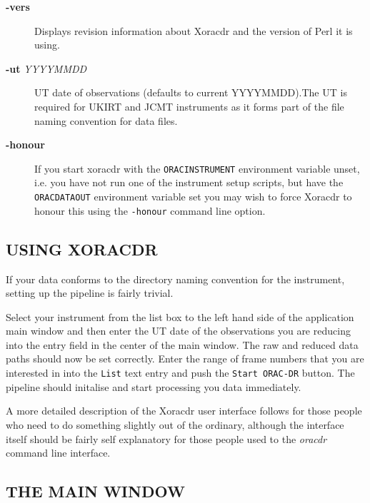 \documentclass[twoside,11pt]{article}
\renewcommand{\_}{\texttt{\symbol{95}}}
\begin{document}
\begin{description}

\item[\textbf{-vers}] \mbox{}

Displays revision information about Xoracdr and the version of Perl it
is using.


\item[\textbf{-ut} \textit{YYYYMMDD}] \mbox{}

UT date of observations (defaults to current YYYYMMDD).The UT is
required for UKIRT and JCMT instruments as it forms part of the file
naming convention for data files.


\item[\textbf{-honour}] \mbox{}

If you start xoracdr with the \texttt{ORAC\_INSTRUMENT} environment variable
unset, i.e. you have not run one of the instrument setup scripts, but
have the \texttt{ORAC\_DATA\_OUT} environment variable set you may wish to
force Xoracdr to honour this using the \texttt{-honour} command line option.

\end{description}
\subsection*{USING XORACDR\label{Xoracdr_USING_XORACDR}}


If your data conforms to the directory naming convention for the
instrument, setting up the pipeline is fairly trivial.



Select your instrument from the list box to the left hand side of the
application main window and then enter the UT date of the observations
you are reducing into the entry field in the center of the main
window. The raw and reduced data paths should now be set
correctly. Enter the range of frame numbers that you are interested in
into the \texttt{List} text entry and push the \texttt{Start ORAC-DR} button. The
pipeline should initalise and start processing you data immediately.



A more detailed description of the Xoracdr user interface follows for
those people who need to do something slightly out of the ordinary,
although the interface itself should be fairly self explanatory for
those people used to the \emph{oracdr} command line interface.

\subsection*{THE MAIN WINDOW\label{Xoracdr_THE_MAIN_WINDOW}}
\end{document}
